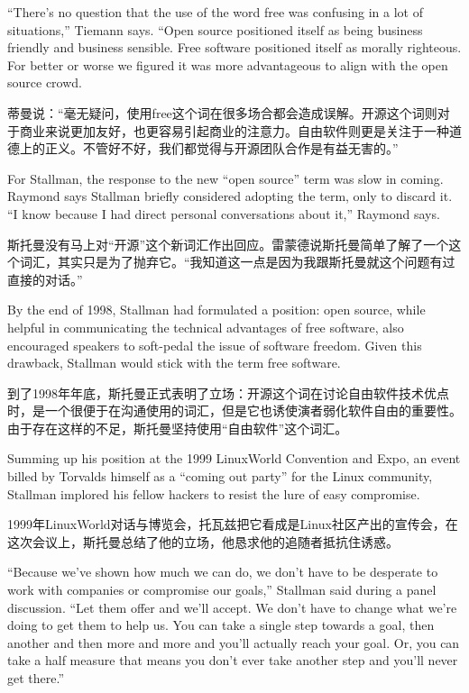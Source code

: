 \ifdefined\eng
``There's no question that the use of the word free was confusing in a lot of situations,'' Tiemann says. ``Open source positioned itself as being business friendly and business sensible. Free software positioned itself as morally righteous. For better or worse we figured it was more advantageous to align with the open source crowd.
\fi

\ifdefined\chs
蒂曼说：``毫无疑问，使用free这个词在很多场合都会造成误解。开源这个词则对于商业来说更加友好，也更容易引起商业的注意力。自由软件则更是关注于一种道德上的正义。不管好不好，我们都觉得与开源团队合作是有益无害的。''
\fi

\ifdefined\eng
For Stallman, the response to the new ``open source'' term was slow in coming. Raymond says Stallman briefly considered adopting the term, only to discard it. ``I know because I had direct personal conversations about it,'' Raymond says.
\fi

\ifdefined\chs
斯托曼没有马上对``开源''这个新词汇作出回应。雷蒙德说斯托曼简单了解了一个这个词汇，其实只是为了抛弃它。``我知道这一点是因为我跟斯托曼就这个问题有过直接的对话。''
\fi

\ifdefined\eng
By the end of 1998, Stallman had formulated a position: open source, while helpful in communicating the technical advantages of free software, also encouraged speakers to soft-pedal the issue of software freedom. Given this drawback, Stallman would stick with the term free software.
\fi

\ifdefined\chs
到了1998年年底，斯托曼正式表明了立场：开源这个词在讨论自由软件技术优点时，是一个很便于在沟通使用的词汇，但是它也诱使演者弱化软件自由的重要性。由于存在这样的不足，斯托曼坚持使用``自由软件''这个词汇。
\fi

\ifdefined\eng
Summing up his position at the 1999 LinuxWorld Convention and Expo, an event billed by Torvalds himself as a ``coming out party'' for the Linux community, Stallman implored his fellow hackers to resist the lure of easy compromise.
\fi

\ifdefined\chs
1999年LinuxWorld对话与博览会，托瓦兹把它看成是Linux社区产出的宣传会，在这次会议上，斯托曼总结了他的立场，他恳求他的追随者抵抗住诱惑。
\fi

\ifdefined\eng
``Because we've shown how much we can do, we don't have to be desperate to work with companies or compromise our goals,'' Stallman said during a panel discussion. ``Let them offer and we'll accept. We don't have to change what we're doing to get them to help us. You can take a single step towards a goal, then another and then more and more and you'll actually reach your goal. Or, you can take a half measure that means you don't ever take another step and you'll never get there.''
\fi

